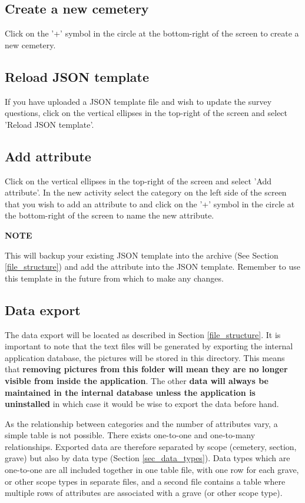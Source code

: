 \documentclass{scrreprt}
\begin{document}
\subsection{Create a new cemetery}
Click on the '+' symbol in the circle at the bottom-right of the screen to create a new cemetery.

\subsection{Reload JSON template}
If you have uploaded a JSON template file and wish to update the survey questions, click on the vertical ellipses in the top-right of the screen and select 'Reload JSON template'.

\subsection{Add attribute}
Click on the vertical ellipses in the top-right of the screen and select 'Add attribute'. In the new activity select the category on the left side of the screen that you wish to add an attribute to and click on the '+' symbol in the circle at the bottom-right of the screen to name the new attribute.

\textbf{NOTE}

This will backup your existing JSON template into the archive (See Section \ref{file_structure}) and add the attribute into the JSON template. Remember to use this template in the future from which to make any changes.

\subsection{Data export}
The data export will be located as described in Section \ref{file_structure}. It is important to note that the text files will be generated by exporting the internal application database, the pictures will be stored in this directory. This means that \textbf{removing pictures from this folder will mean they are no longer visible from inside the application}. The other \textbf{data will always be maintained in the internal database unless the application is uninstalled} in which case it would be wise to export the data before hand.

As the relationship between categories and the number of attributes vary, a simple table is not possible. There exists one-to-one and one-to-many relationships. Exported data are therefore separated by scope (cemetery, section, grave) but also by data type (Section \ref{sec_data_types}). Data types which are one-to-one are all included together in one table file, with one row for each grave, or other scope types in separate files, and a second file contains a table where multiple rows of attributes are associated with a grave (or other scope type).
\end{document}
